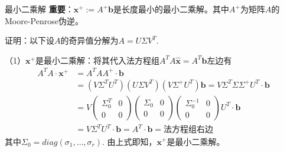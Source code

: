 
\begin{frame}

\begin{block}{最小二乘解}
{\bfseries 重要}：$\mathbf{x}^+ := A^+\mathbf{b}$是长度最小的最小二乘解。其中$A^+$为矩阵$A$的Moore-Penrose伪逆。

\vspace{1em}
\pause

证明：以下设$A$的奇异值分解为$A = U\Sigma V^T$.

（1）$\mathbf{x}^+$是最小二乘解：将其代入法方程组$A^TA\widehat{\mathbf{x}} = A^T\mathbf{b}$左边有
\begin{align*}
A^TA\cdot\mathbf{x}^+ & = A^TAA^+ \cdot \mathbf{b} \\
& = (V\Sigma^TU^T)(U\Sigma V^T)(V\Sigma^+ U^T) \mathbf{b} = V\Sigma^T\Sigma\Sigma^+ U^T \cdot \mathbf{b} \\
& = V \begin{pmatrix} \Sigma_0^T & 0 \\ 0 & 0 \end{pmatrix} \begin{pmatrix} \Sigma_0 & 0 \\ 0 & 0 \end{pmatrix} \begin{pmatrix} \Sigma_0^{-1} & 0 \\ 0 & 0 \end{pmatrix} U^T \cdot \mathbf{b} \\
& = V \Sigma^T U^T \cdot \mathbf{b} = A^T \cdot \mathbf{b} = \text{法方程组右边}
\end{align*}
其中$\Sigma_0 = diag(\sigma_1, \ldots, \sigma_r)$. 由上式即知，$\mathbf{x}^+$是最小二乘解。
\end{block}

\end{frame}


